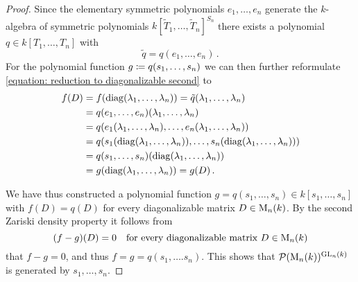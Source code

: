 \begin{proof}
  Since the elementary symmetric polynomials $e_1, \dotsc, e_n$ generate the $k$-algebra of symmetric polynomials $k[\tilde{T}_1, \dotsc, \tilde{T}_n]^{S_n}$ there exists a polynomial $q \in k[T_1, \dotsc, T_n]$ with
  \[
      \tilde{q}
    = q(e_1, \dotsc, e_n) \,.
  \]
  For the polynomial function $g \coloneqq q(s_1, \dotsc, s_n)$ we can then further reformulate \eqref{equation: reduction to diagonalizable second} to
  \begin{align*}
        f(D)
    &=  f(\operatorname{diag}(\lambda_1, \dotsc, \lambda_n))
     =  \tilde{q}(\lambda_1, \dotsc, \lambda_n) \\
    &=  q(e_1, \dotsc, e_n)(\lambda_1, \dotsc, \lambda_n) \\
    &=  q( e_1(\lambda_1, \dotsc, \lambda_n), \dotsc, e_n(\lambda_1, \dotsc, \lambda_n)  )  \\
    &=  q( s_1( \operatorname{diag}(\lambda_1, \dotsc, \lambda_n) ), \dotsc, s_n( \operatorname{diag}(\lambda_1, \dotsc, \lambda_n) )  )  \\
    &=  q(s_1, \dotsc, s_n)( \operatorname{diag}(\lambda_1, \dotsc, \lambda_n) )  \\
    &=  g( \operatorname{diag}(\lambda_1, \dotsc, \lambda_n) )
     =  g(D) \,.
  \end{align*}
  
  We have thus constructed a polynomial function $g = q(s_1, \dotsc, s_n) \in k[s_1, \dotsc, s_n]$ with $f(D) = q(D)$ for every diagonalizable matrix $D \in \operatorname{M}_n(k)$.
  By the second Zariski density property it follows from
  \[
    (f - g)(D) = 0
    \quad
    \text{for every diagonalizable matrix $D \in \operatorname{M}_n(k)$}
  \]
  that $f - g = 0$, and thus $f = g = q(s_1, \dotsc. s_n)$.
  This shows that $\mathcal{P}(\operatorname{M}_n(k))^{\operatorname{GL}_n(k)}$ is generated by $s_1, \dotsc, s_n$.
\end{proof}


